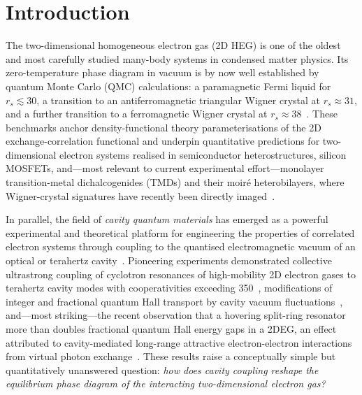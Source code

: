 
\section{Introduction}

The two-dimensional homogeneous electron gas (2D HEG) is one of the
oldest and most carefully studied many-body systems in condensed matter
physics. Its zero-temperature phase diagram in vacuum is by now well
established by quantum Monte Carlo (QMC) calculations: a paramagnetic
Fermi liquid for $r_s \lesssim 30$, a transition to an
antiferromagnetic triangular Wigner crystal at
$r_s \approx 31$, and a further transition to a ferromagnetic Wigner
crystal at $r_s \approx 38$~\cite{TanatarCeperley1989,DrummondNeeds2009,
2DHEG_QMC_2024}. These benchmarks anchor density-functional theory
parameterisations of the 2D exchange-correlation functional and underpin
quantitative predictions for two-dimensional electron systems realised in
semiconductor heterostructures, silicon MOSFETs, and—most relevant to
current experimental effort—monolayer transition-metal dichalcogenides
(TMDs) and their moir\'e heterobilayers, where Wigner-crystal signatures
have recently been directly imaged~\cite{Smolenski2021,TsuiWigner2024}.

In parallel, the field of \emph{cavity quantum materials} has emerged as
a powerful experimental and theoretical platform for engineering the
properties of correlated electron systems through coupling to the
quantised electromagnetic vacuum of an optical or terahertz
cavity~\cite{Schlawin2022_review}. Pioneering experiments demonstrated
collective ultrastrong coupling of cyclotron resonances of
high-mobility 2D electron gases to terahertz cavity modes with
cooperativities exceeding 350~\cite{Bayer2017,LiX2018,
ParaviciniBagliani2018}, modifications of integer and fractional
quantum Hall transport by cavity vacuum
fluctuations~\cite{Smolka2014,Appugliese2022}, and—most striking—the
recent observation that a hovering split-ring resonator more than
doubles fractional quantum Hall energy gaps in a 2DEG, an effect
attributed to cavity-mediated long-range attractive electron-electron
interactions from virtual photon exchange~\cite{Enkner2024}. These
results raise a conceptually simple but quantitatively unanswered
question: \emph{how does cavity coupling reshape the equilibrium phase
diagram of the interacting two-dimensional electron gas?}

